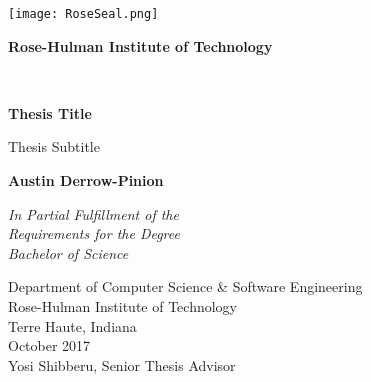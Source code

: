 \begin{titlepage}
    \begin{center}
        \vspace*{0.4cm}

        \noindent\begin{minipage}{0.3\textwidth}
        \texttt{[image: RoseSeal.png]}
        \end{minipage}
        \hfill
        \begin{minipage}{0.6\textwidth}
        \raggedright\LARGE\bfseries
        Rose-Hulman Institute of Technology
        \end{minipage}

        \vspace*{1cm}

        \noindent\makebox[\linewidth]{\rule{\textwidth}{1pt}}\\
        \vspace{0.4cm}
        {\Huge \bfseries
        Thesis Title  %
        \par}
        \vspace{0.4cm}
        \noindent\makebox[\linewidth]{\rule{\textwidth}{1pt}}

        \vspace{0.5cm}
        \LARGE
        Thesis Subtitle

        \vspace{1.5cm}

        \textbf{Austin Derrow-Pinion}

        \vfill

        \large
        \textit{
            In Partial Fulfillment of the\\
            Requirements for the Degree\\
            Bachelor of Science
        }

        \vspace{1cm}

        \Large
        Department of Computer Science \& Software Engineering\\
        Rose-Hulman Institute of Technology\\
        Terre Haute, Indiana\\
        October 2017\\
        Yosi Shibberu, Senior Thesis Advisor

    \end{center}
\end{titlepage}
